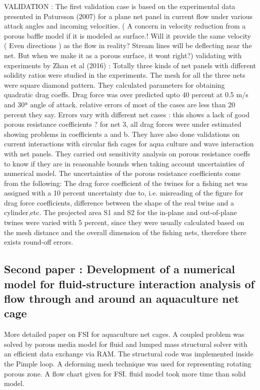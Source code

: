 \documentclass[letterpaper,12pt]{article}
\begin{document}
VALIDATION : The first validation case is based on the experimental data presented in Patursson (2007) for a plane net panel in current
flow under various attack angles and incoming velocities. ( A concern in velocity reduction from a porous baffle model if it is modeled as surface.! Will it provide the same velocity ( Even directions ) as the flow in reality? Stream lines will be deflecting near the net. But when we  make it as a porous surface, it wont right?)
validating with experiments by Zhan et al (2016) : Totally three kinds of net panels with different solidity ratios were studied in the experiments. The mesh for all the three nets were square diamond pattern. They calculated parameters for obtaining quadratic drag coeffs. Drag force was over predicted upto 40 percent  at 0.5 m/s and 30ª angle of attack. relative errors of most of the cases are less than 20 percent they say.
 Errors vary with different net cases : this shows a lack of good porous resistance coefficients ? for net 3, all drag forces were under estimated showing problems in coefficients a and b.
They have also done validations on current interactions with circular fish cages for aqua culture and wave interaction with net panels.
They carried out sensitivity analysis on porous resistance coeffs to know if they are in reasonable bounds when taking account uncertainties of numerical model. The uncertainties of the porous resistance coefficients come from the following: The drag force coefficient of the twines for a fishing net was assigned with a 10 percent uncertainty due to, i.e. misreading of the figure for drag force coefficients, difference between the shape of the real twine and a cylinder,etc. The projected area S1 and S2 for the in-plane and out-of-plane twines were varied with 5 percent, since they were usually calculated based on the mesh distance and the overall dimension of the fishing nets, therefore there exists round-off errors.
\subsection{Second paper : Development of a numerical model for fluid-structure interaction analysis
of flow through and around an aquaculture net cage}
More detailed paper on FSI for aquaculture net cages. A coupled problem was solved by porous media model for fluid and lumped mass structural solver with an efficient data exchange via RAM. The structural code was implemented inside the Pimple loop. A deforming mesh technique was used for representing rotating porous zone. A flow chart given for FSI. fluid model took more time than solid model. 
\end{document}
